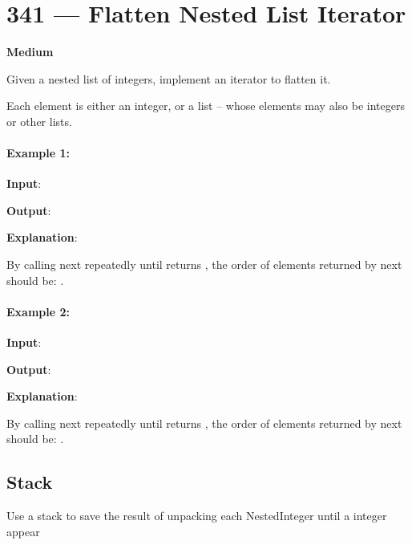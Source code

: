 \section{341 --- Flatten Nested List Iterator}

\textbf{Medium}

Given a nested list of integers, implement an iterator to flatten it.

Each element is either an integer, or a list -- whose elements may also be integers or other lists.

\paragraph{Example 1:}

\begin{flushleft}
\textbf{Input}: \fcj{[[1,1],2,[1,1]]}

\textbf{Output}: \fcj{[1,1,2,1,1]}

\textbf{Explanation}: 

By calling next repeatedly until  returns , the order of elements returned by next should be: \fcj{[1,1,2,1,1]}.
\end{flushleft}

\paragraph{Example 2:}

\begin{flushleft}
\textbf{Input}: 

\textbf{Output}: \fcj{[1,4,6]}

\textbf{Explanation}: 

By calling next repeatedly until  returns , the order of elements returned by next should be: \fcj{[1,4,6]}.

\end{flushleft}

\subsection{Stack}
Use a stack to save the result of unpacking each NestedInteger until a integer appear

